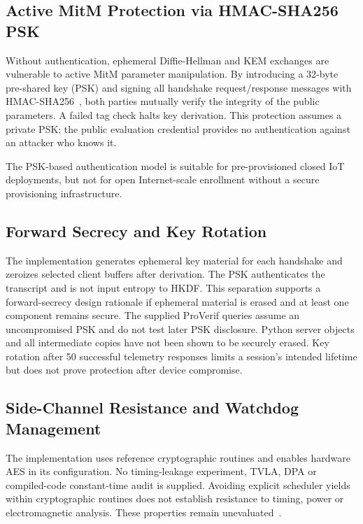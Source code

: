\documentclass[journal, 10pt]{IEEEtran}
\begin{document}
\subsection{Active MitM Protection via HMAC-SHA256 PSK}
Without authentication, ephemeral Diffie-Hellman and KEM exchanges are vulnerable to active MitM parameter manipulation. By introducing a 32-byte pre-shared key (PSK) and signing all handshake request/response messages with HMAC-SHA256~\cite{b24,b37}, both parties mutually verify the integrity of the public parameters. A failed tag check halts key derivation. This protection assumes a private PSK; the public evaluation credential provides no authentication against an attacker who knows it.

The PSK-based authentication model is suitable for pre-provisioned closed IoT deployments, but not for open Internet-scale enrollment without a secure provisioning infrastructure.

\subsection{Forward Secrecy and Key Rotation}
The implementation generates ephemeral key material for each handshake and zeroizes selected client buffers after derivation. The PSK authenticates the transcript and is not input entropy to HKDF. This separation supports a forward-secrecy design rationale if ephemeral material is erased and at least one component remains secure. The supplied ProVerif queries assume an uncompromised PSK and do not test later PSK disclosure. Python server objects and all intermediate copies have not been shown to be securely erased. Key rotation after 50 successful telemetry responses limits a session's intended lifetime but does not prove protection after device compromise.

\subsection{Side-Channel Resistance and Watchdog Management}
The implementation uses reference cryptographic routines and enables hardware AES in its configuration. No timing-leakage experiment, TVLA, DPA or compiled-code constant-time audit is supplied. Avoiding explicit scheduler yields within cryptographic routines does not establish resistance to timing, power or electromagnetic analysis. These properties remain unevaluated~\cite{b18,b40}.
\end{document}
